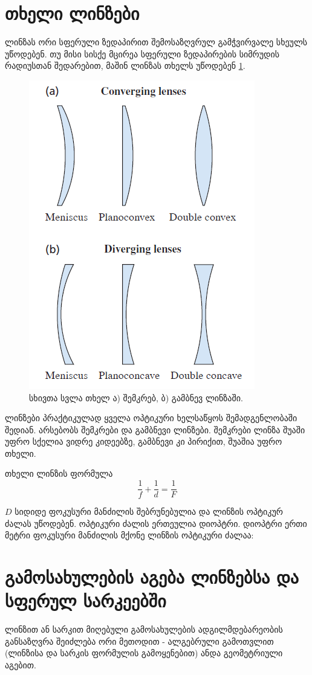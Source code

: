 \documentclass[a4paper]{book}
\begin{document}
\section{თხელი ლინზები} ლინზას ორი სფერული ზედაპირით შემოსაზღვრულ გამჭვირვალე სხეულს უწოდებენ. თუ მისი სისქე მცირეა სფერული ზედაპირების სიმრუდის რადიუსთან შედარებით, მაშინ ლინზას თხელს უწოდებენ \ref{fig:thin_lenses}.
		\begin{figure}[h]
		   \centering
           \includegraphics[width=0.4\columnwidth]{figures/thin_lenses}
           \caption{სხივთა სვლა თხელ ა) შემკრებ, ბ) გამბნევ ლინზაში.}
           \label{fig:thin_lenses}
        \end{figure}


ლინზები პრაქტიკულად ყველა ოპტიკური ხელსაწყოს შემადგენლობაში შედიან. არსებობს შემკრები და გამბნევი ლინზები. შემკრები ლინზა შუაში უფრო სქელია ვიდრე კიდეებზე, გამბნევი კი პირიქით, შუაშია უფრო თხელი.

თხელი ლინზის ფორმულა
	\begin{equation}
		\frac{1}{f} + \frac{1}{d} = \frac{1}{F}
	\end{equation}

$D$ სიდიდე ფოკუსური მანძილის შებრუნებულია და ლინზის ოპტიკურ ძალას უწოდებენ. ოპტიკური ძალის ერთეულია დიოპტრი. დიოპტრი ერთი მეტრი ფოკუსური მანძილის მქონე ლინზის ოპტიკური ძალაა:


\section{გამოსახულების აგება ლინზებსა და სფერულ სარკეებში}
ლინზით ან სარკით მიღებული გამოსახულების ადგილმდებარეობის განსაზღვრა შეიძლება ორი მეთოდით - ალგებრული გამოთვლით (ლინზისა და სარკის ფორმულის გამოყენებით) ანდა გეომეტრიული აგებით.
\end{document}
